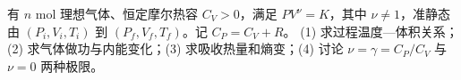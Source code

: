 有 \(n\) mol 理想气体、恒定摩尔热容 \(C_V>0\)，满足 \(PV^\nu=K\)，其中 \(\nu\ne1\)，准静态由 \((P_i,V_i,T_i)\) 到 \((P_f,V_f,T_f)\)。记 \(C_P=C_V+R\)。
(1) 求过程温度—体积关系；(2) 求气体做功与内能变化；(3) 求吸收热量和熵变；(4) 讨论 \(\nu=\gamma=C_P/C_V\) 与 \(\nu=0\) 两种极限。
